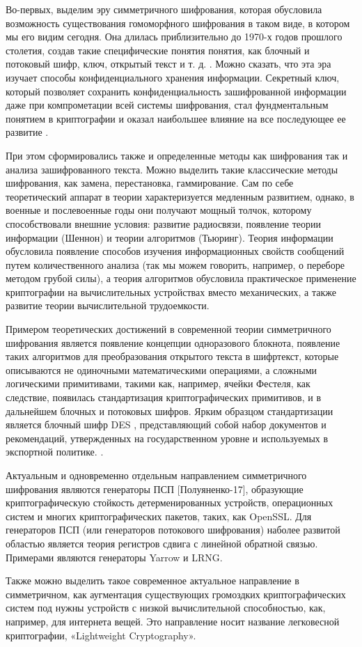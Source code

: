     \color{Salmon}Во-первых, выделим эру симметричного шифрования, которая обусловила возможность существования гомоморфного шифрования в таком виде, в котором мы его видим сегодня. Она длилась приблизительно до 1970-х годов прошлого столетия, создав такие специфические понятия понятия, как блочный и потоковый шифр, ключ, открытый текст и т. д. \cite{KorobBasics-04}. Можно сказать, что эта эра изучает способы конфиденциального хранения информации. Секретный ключ, который позволяет сохранить конфиденциальность зашифрованной информации даже при компрометации всей системы шифрования, стал фундментальным понятием в криптографии и оказал наибольшее влияние на все последующее ее развитие \cite{NewDirs-76}.\par
    При этом сформировались также и определенные методы как шифрования так и анализа зашифрованного текста. Можно выделить такие классические методы шифрования, как замена, перестановка, гаммирование. Сам по себе теоретический аппарат в теории характеризуется медленным развитием, однако, в военные и послевоенные годы они получают мощный толчок, которому способствовали внешние условия: развитие радиосвязи, появление теории информации (Шеннон) и теории алгоритмов (Тьюринг). Теория информации обусловила появление способов изучения информационных свойств сообщений путем количественного анализа (так мы можем говорить, например, о переборе методом грубой силы), а теория алгоритмов обусловила практическое применение криптографии на вычислительных устройствах вместо механических, а также развитие теории вычислительной трудоемкости.\par
    Примером теоретических достижений в современной теории симметричного шифрования является появление концепции одноразового блокнота, появление таких алгоритмов для преобразования открытого текста в шифртекст, которые описываются не одиночными математическими операциями,  а сложными логическими примитивами, такими как, например, ячейки Фестеля, как следствие, появилась стандартизация  криптографических примитивов, и в дальнейшем блочных и потоковых шифров. Ярким образцом стандартизации является блочный шифр DES \cite{fips46-3}, представляющий собой набор документов и рекомендаций, утвержденных на государственном уровне и используемых в экспортной политике. \cite{SusanNewCentury-00}.\par
    Актуальным и одновременно отдельным направлением симметричного шифрования являются генераторы ПСП [Полуяненко-17], образующие криптографическую стойкость детерменированных устройств, операционных систем и многих криптографических пакетов,  таких, как OpenSSL. Для генераторов ПСП (или генераторов потокового шифрования)  наболее развитой областью является теория регистров сдвига с линейной обратной связью. Примерами являются генераторы Yarrow и LRNG. \cite{Yarrow-99}\cite{LRNG-18}\par
    Также можно выделить такое современное актуальное направление в симметричном, как аугментация существующих громоздких криптографических систем под нужны устройств с низкой вычислительной способностью, как, например, для интернета вещей. Это направление носит название легковесной криптографии, «Lightweight Cryptography». \cite{SoALightSymm-17}\par

